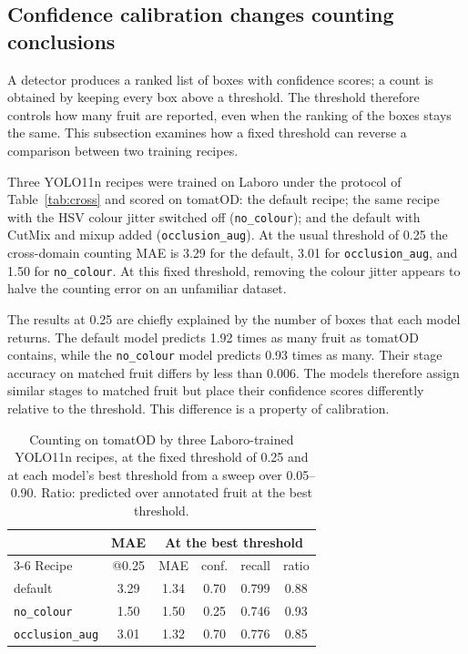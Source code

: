 \subsection{Confidence calibration changes counting conclusions}
\label{sec:calibration}

A detector produces a ranked list of boxes with confidence scores; a count is
obtained by keeping every box above a threshold. The threshold therefore
controls how many fruit are reported, even when the ranking of the boxes stays
the same. This subsection examines how a fixed threshold can reverse a
comparison between two training recipes.

Three YOLO11n recipes were trained on Laboro under the protocol of
Table~\ref{tab:cross} and scored on tomatOD: the default recipe; the same
recipe with the HSV colour jitter switched off (\texttt{no\_colour}); and the
default with CutMix and mixup added (\texttt{occlusion\_aug}). At the usual
threshold of 0.25 the cross-domain counting MAE is 3.29 for the default, 3.01
for \texttt{occlusion\_aug}, and 1.50 for \texttt{no\_colour}. At this fixed
threshold, removing the colour jitter appears to halve the counting error on
an unfamiliar dataset.

The results at 0.25 are chiefly explained by the number of boxes that each
model returns. The default model predicts 1.92 times as many fruit as tomatOD
contains, while the \texttt{no\_colour} model predicts 0.93 times as many. Their
stage accuracy on matched fruit differs by less than 0.006. The models therefore
assign similar stages to matched fruit but place their confidence scores
differently relative to the threshold. This difference is a property of
calibration.

\begin{table}[t]
\centering
\caption{Counting on tomatOD by three Laboro-trained YOLO11n recipes, at the
fixed threshold of 0.25 and at each model's best threshold from a sweep over
0.05--0.90. Ratio: predicted over annotated fruit at the best threshold.}
\label{tab:calibration}
\setlength{\tabcolsep}{4pt}
\begin{tabular}{lccccc}
\toprule
& MAE & \multicolumn{4}{c}{At the best threshold}\\
\cmidrule(lr){3-6}
Recipe & @0.25 & MAE & conf. & recall & ratio \\
\midrule
default              & 3.29 & 1.34 & 0.70 & 0.799 & 0.88 \\
\texttt{no\_colour}   & 1.50 & 1.50 & 0.25 & 0.746 & 0.93 \\
\texttt{occlusion\_aug} & 3.01 & 1.32 & 0.70 & 0.776 & 0.85 \\
\bottomrule
\end{tabular}
\end{table}

